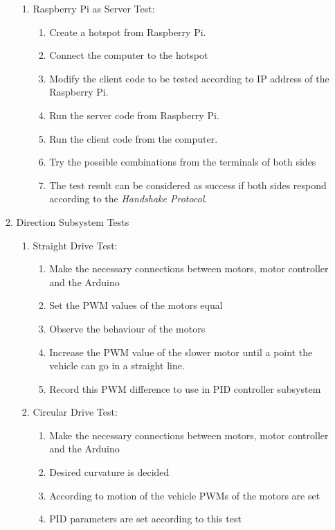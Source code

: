 \documentclass[a4paper,12pt]{article}
\begin{document}
\begin{enumerate}
\begin{enumerate}
\begin{enumerate}
		\item Raspberry Pi as Server Test:
			
			\begin{enumerate}
				\item Create a hotspot from Raspberry Pi.  
				\item Connect the computer to the hotspot  
				\item Modify the client code to be tested according to IP address of the Raspberry Pi.  
				\item Run the server code from Raspberry Pi.  
				\item Run the client code from the computer.  
				\item Try the possible combinations from the terminals of both sides  
				\item The test result can be considered as success if both sides respond according to the \textit{Handshake Protocol}. 
			\end{enumerate}	
		
		\end{enumerate}
		
	
	\item {Direction Subsystem Tests}
	\begin{enumerate}
	
		\item Straight Drive Test:
			
			\begin{enumerate}
				\item Make the necessary connections between motors, motor controller and the Arduino  
				\item Set the PWM values of the motors equal  
				\item Observe the behaviour of the motors  
				\item Increase the PWM value of the slower motor until a point the vehicle can go in a straight line.
				\item Record this PWM difference to use in PID controller subsystem
			\end{enumerate}
				
			
		
		\item Circular Drive Test:
			\begin{enumerate}
				\item Make the necessary connections between motors, motor controller and the Arduino  
				\item Desired curvature is decided  
				\item  According to motion of the vehicle PWMs of the motors are set  
				\item  PID parameters are set according to this test
			\end{enumerate}
		

\end{enumerate}
\end{enumerate}
\end{enumerate}
\end{document}
